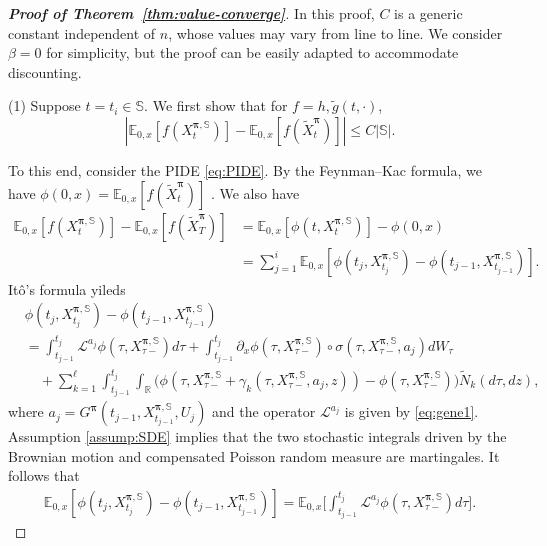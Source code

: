 \documentclass[11pt]{article}
\newcommand{\1}{\mathbbm{1}}
\newcommand{\bpi}{\boldsymbol{\pi}}
\begin{document}
\begin{proof}[\bf Proof of Theorem~\ref{thm:value-converge}]
In this proof, $C$ is a generic constant independent of $n$, whose values may vary from line to line. We consider $\beta=0$ for simplicity, but the proof can be easily adapted to accommodate discounting.


\noindent(1) Suppose $t=t_i\in\mathbb{S}$. We first show that for $f=h, \tilde{g}(t,\cdot)$,
\begin{equation} \label{eq:hT-limit}
|\mathbb{E}_{0,x}[f(X_{t}^{\bpi, \mathbb{S}})] - \mathbb{E}_{0,x}[f(\tilde{X}_{t}^{\bpi} )]|\leq C|\mathbb{S}|.
\end{equation}

To this end, consider the PIDE \eqref{eq:PIDE}. By the Feynman--Kac formula, we have $\phi(0, x) = \mathbb{E}_{0,x}[f(\tilde X_t^{\bpi})]$ . We also have
\begin{align}\label{eq:terminal-gap}
\mathbb{E}_{0,x}[f( X_t^{\bpi,\mathbb{S}})] - \mathbb{E}_{0,x}[f(\tilde X_T^{\bpi})]
&= \mathbb{E}_{0,x}[\phi(t, X_t^{\bpi, \mathbb{S}})] - \phi(0, x) \\
& =  \sum_{j=1}^{i} \mathbb{E}_{0,x}[\phi(t_j, X_{t_j}^{\bpi, \mathbb{S}}) - \phi(t_{j-1}, X_{t_{j-1}}^{\bpi, \mathbb{S}})].
\end{align}
It\^o's formula yileds
\begin{align*}
&\phi(t_j, X_{t_j}^{\bpi,\mathbb{S}}) - \phi(t_{j-1}, X_{t_{j-1}}^{\bpi,\mathbb{S}}) \\
&= \int_{t_{j-1}}^{t_j}\mathcal{L}^{a_j} \phi(\tau, X_{\tau-}^{\bpi,\mathbb{S}})d\tau +   \int_{t_{j-1}}^{t_j}\partial_x\phi(\tau, X_{\tau-}^{\bpi, \mathbb{S}}) \circ {\sigma}(\tau,  X^{\bpi, \mathbb{S}}_{\tau-}, a_j) dW_\tau \\
& \quad +  \sum_{k=1}^\ell \int_{t_{j-1}}^{t_j}  \int_{\mathbb{R}} \big( \phi(\tau, X^{\bpi, \mathbb{S}}_{\tau-} + \gamma_k(\tau, X^{\bpi, \mathbb{S}}_{\tau-}, a_j,z)) -  \phi(\tau,X^{\bpi, \mathbb{S}}_{\tau-})\big) \widetilde{N}_k(d\tau, dz),
\end{align*}
where $a_j=G^{\bpi}(t_{j-1}, X^{\bpi, \mathbb{S}}_{t_{j-1}}, U_{j})$ and the operator $\mathcal{L}^{a_j}$ is given by \eqref{eq:gene1}. Assumption \ref{assump:SDE} implies that the two stochastic integrals driven by the Brownian motion and compensated Poisson random measure are martingales. It follows that
\begin{align*}
 \mathbb{E}_{0,x}[\phi(t_j, X_{t_j}^{\bpi,\mathbb{S}}) - \phi(t_{j-1}, X_{t_{j-1}}^{\bpi, \mathbb{S}})] = \mathbb{E}_{0,x}\Big[ \int_{t_{j-1}}^{t_j}\mathcal{L}^{a_j}\phi(\tau, X_{\tau-}^{\bpi, \mathbb{S}})d\tau\Big].

\end{align*}
\end{proof}
\end{document}
